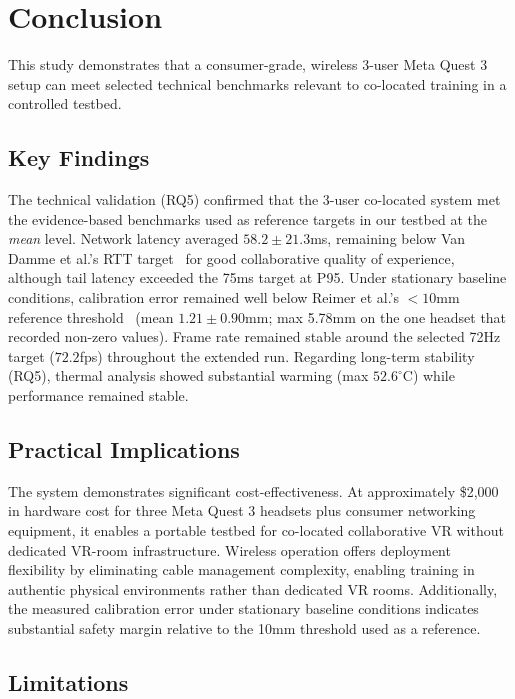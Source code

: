 \section{Conclusion}

This study demonstrates that a consumer-grade, wireless 3-user Meta Quest 3 setup can meet selected technical benchmarks relevant to co-located training in a controlled testbed.

\subsection{Key Findings}

The technical validation (RQ5) confirmed that the 3-user co-located system met the evidence-based benchmarks used as reference targets in our testbed at the \emph{mean} level. Network latency averaged $58.2 \pm 21.3$ms, remaining below Van Damme et al.'s RTT target~\cite{VanDammeSam2024Iolo} for good collaborative quality of experience, although tail latency exceeded the 75ms target at P95. Under stationary baseline conditions, calibration error remained well below Reimer et al.'s $<10$mm reference threshold~\cite{ReimerDennis2021CfSV} (mean $1.21 \pm 0.90$mm; max 5.78mm on the one headset that recorded non-zero values). Frame rate remained stable around the selected 72Hz target ($72.2$fps) throughout the extended run. Regarding long-term stability (RQ5), thermal analysis showed substantial warming (max $52.6^{\circ}$C) while performance remained stable.

\subsection{Practical Implications}

The system demonstrates significant cost-effectiveness. At approximately \$2,000 in hardware cost for three Meta Quest 3 headsets plus consumer networking equipment, it enables a portable testbed for co-located collaborative VR without dedicated VR-room infrastructure. Wireless operation offers deployment flexibility by eliminating cable management complexity, enabling training in authentic physical environments rather than dedicated VR rooms. Additionally, the measured calibration error under stationary baseline conditions indicates substantial safety margin relative to the 10mm threshold used as a reference.

\subsection{Limitations}


